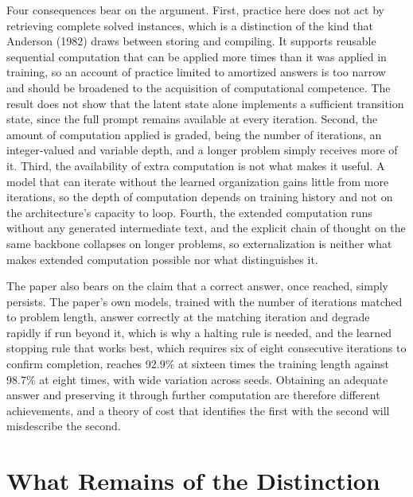\documentclass[11pt]{article}
\theoremstyle{definition}
\begin{document}
Four consequences bear on the argument. First, practice here does not act by retrieving complete solved instances, which is a distinction of the kind that Anderson (1982) draws between storing and compiling. It supports reusable sequential computation that can be applied more times than it was applied in training, so an account of practice limited to amortized answers is too narrow and should be broadened to the acquisition of computational competence. The result does not show that the latent state alone implements a sufficient transition state, since the full prompt remains available at every iteration. Second, the amount of computation applied is graded, being the number of iterations, an integer-valued and variable depth, and a longer problem simply receives more of it. Third, the availability of extra computation is not what makes it useful. A model that can iterate without the learned organization gains little from more iterations, so the depth of computation depends on training history and not on the architecture's capacity to loop. Fourth, the extended computation runs without any generated intermediate text, and the explicit chain of thought on the same backbone collapses on longer problems, so externalization is neither what makes extended computation possible nor what distinguishes it.

The paper also bears on the claim that a correct answer, once reached, simply persists. The paper's own models, trained with the number of iterations matched to problem length, answer correctly at the matching iteration and degrade rapidly if run beyond it, which is why a halting rule is needed, and the learned stopping rule that works best, which requires six of eight consecutive iterations to confirm completion, reaches 92.9\% at sixteen times the training length against 98.7\% at eight times, with wide variation across seeds. Obtaining an adequate answer and preserving it through further computation are therefore different achievements, and a theory of cost that identifies the first with the second will misdescribe the second.

\section{What Remains of the Distinction}
\end{document}
